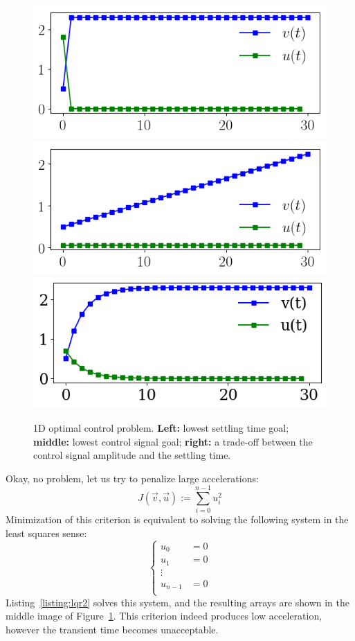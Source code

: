 \documentclass[notitlepage,oneside]{book}
\begin{document}
\begin{figure}[htb]
    \centering
    \includegraphics[width=.32\linewidth]{img/example_6.1_a.png}
    \includegraphics[width=.32\linewidth]{img/example_6.1_b.png}
    \includegraphics[width=.32\linewidth]{img/example_6.1_c.png}
    \caption{1D optimal control problem. \textbf{Left:} lowest settling time goal; \textbf{middle:} lowest control signal goal; \textbf{right:} a trade-off between the control signal amplitude and the settling time.}
    \label{fig:lqr}
\end{figure}

Okay, no problem, let us try to penalize large accelerations:
$$
J(\vec{v}, \vec{u}) := \sum\limits_{i=0}^{n-1} u_i^2
$$
Minimization of this criterion is equivalent to solving the following system in the least squares sense:
$$
\left \{ \begin{array}{rl}
u_0     & = 0\\
u_1     & = 0\\
\vdots   &    \\
u_{n-1} & = 0\\
\end{array} \right.
$$
Listing~\ref{listing:lqr2} solves this system, and the resulting arrays are shown in the middle image of Figure~\ref{fig:lqr}.
This criterion indeed produces low acceleration, however the transient time becomes unacceptable.

\end{document}
